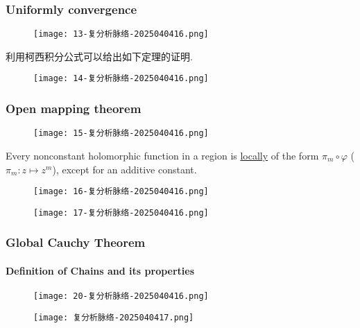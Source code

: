 \subsubsection{Uniformly convergence}

\begin{figure}[H]
\centering
\texttt{[image: 13-复分析脉络-2025040416.png]}
\label{}
\end{figure}

利用柯西积分公式可以给出如下定理的证明.

\begin{figure}[H]
\centering
\texttt{[image: 14-复分析脉络-2025040416.png]}
\label{}
\end{figure}

\subsubsection{Open mapping theorem}

\begin{figure}[H]
\centering
\texttt{[image: 15-复分析脉络-2025040416.png]}
\label{}
\end{figure}

Every nonconstant holomorphic function in a region is \underline{locally} of the form $\pi_{m}\circ\varphi$ ($\pi_{m}:z\mapsto z^{m}$), except for an additive constant.

\begin{figure}[H]
\centering
\texttt{[image: 16-复分析脉络-2025040416.png]}
\label{}
\end{figure}

\begin{figure}[H]
\centering
\texttt{[image: 17-复分析脉络-2025040416.png]}
\label{}
\end{figure}

\subsubsection{Global Cauchy Theorem}

\paragraph{Definition of Chains and its properties}

\begin{figure}[H]
\centering
\texttt{[image: 20-复分析脉络-2025040416.png]}
\label{}
\end{figure}
\begin{figure}[H]
\centering
\texttt{[image: 复分析脉络-2025040417.png]}
\label{}
\end{figure}

